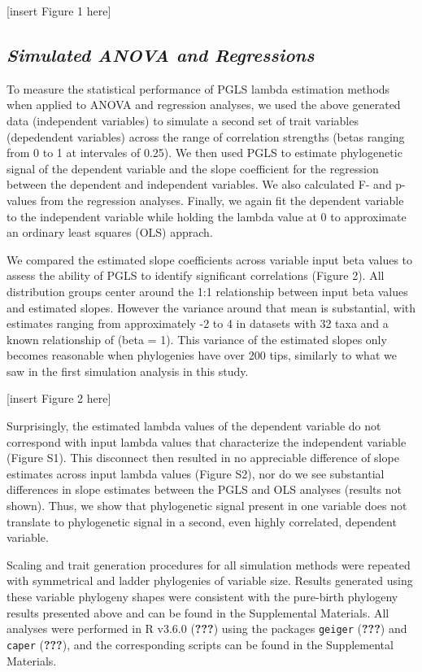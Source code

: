 \documentclass[]{article}
\begin{document}
{[}insert Figure 1 here{]}

\subsection{\texorpdfstring{\emph{Simulated ANOVA and
Regressions}}{Simulated ANOVA and Regressions}}\label{simulated-anova-and-regressions}

To measure the statistical performance of PGLS lambda estimation methods
when applied to ANOVA and regression analyses, we used the above
generated data (independent variables) to simulate a second set of trait
variables (depedendent variables) across the range of correlation
strengths (betas ranging from 0 to 1 at intervales of 0.25). We then
used PGLS to estimate phylogenetic signal of the dependent variable and
the slope coefficient for the regression between the dependent and
independent variables. We also calculated F- and p-values from the
regression analyses. Finally, we again fit the dependent variable to the
independent variable while holding the lambda value at 0 to approximate
an ordinary least squares (OLS) apprach. \hfill\break

We compared the estimated slope coefficients across variable input beta
values to assess the ability of PGLS to identify significant
correlations (Figure 2). All distribution groups center around the 1:1
relationship between input beta values and estimated slopes. However the
variance around that mean is substantial, with estimates ranging from
approximately -2 to 4 in datasets with 32 taxa and a known relationship
of (beta = 1). This variance of the estimated slopes only becomes
reasonable when phylogenies have over 200 tips, similarly to what we saw
in the first simulation analysis in this study. \hfill\break

{[}insert Figure 2 here{]} \hfill\break 

Surprisingly, the estimated lambda values of the dependent variable do
not correspond with input lambda values that characterize the
independent variable (Figure S1). This disconnect then resulted in no
appreciable difference of slope estimates across input lambda values
(Figure S2), nor do we see substantial differences in slope estimates
between the PGLS and OLS analyses (results not shown). Thus, we show
that phylogenetic signal present in one variable does not translate to
phylogenetic signal in a second, even highly correlated, dependent
variable. \hfill\break

Scaling and trait generation procedures for all simulation methods were
repeated with symmetrical and ladder phylogenies of variable size.
Results generated using these variable phylogeny shapes were consistent
with the pure-birth phylogeny results presented above and can be found
in the Supplemental Materials. All analyses were performed in R v3.6.0
({\textbf{???}}) using the packages \texttt{geiger} ({\textbf{???}}) and
\texttt{caper} ({\textbf{???}}), and the corresponding scripts can be
found in the Supplemental Materials.
\end{document}
